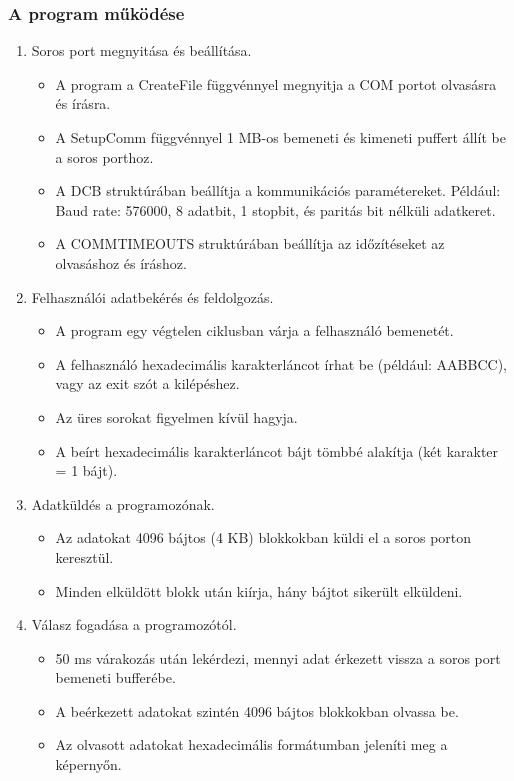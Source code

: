 \documentclass[a4paper,12pt,oneside]{book}
\begin{document}
\subsubsection{A program működése}
\begin{enumerate}
	\item Soros port megnyitása és beállítása.
\begin{itemize}
	\item A program a CreateFile függvénnyel megnyitja a COM portot olvasásra és írásra.
	\item A SetupComm függvénnyel 1 MB-os bemeneti és kimeneti puffert állít be a soros porthoz.
	\item A DCB struktúrában beállítja a kommunikációs paramétereket. Például: Baud rate: 576000, 8 adatbit, 1 stopbit, és paritás bit nélküli adatkeret.
	\item A COMMTIMEOUTS struktúrában beállítja az időzítéseket az olvasáshoz és íráshoz.
\end{itemize}
	\item Felhasználói adatbekérés és feldolgozás.
\begin{itemize}
	\item A program egy végtelen ciklusban várja a felhasználó bemenetét.
	\item A felhasználó hexadecimális karakterláncot írhat be (például: AABBCC), vagy az exit szót a kilépéshez.
	\item Az üres sorokat figyelmen kívül hagyja.
	\item A beírt hexadecimális karakterláncot bájt tömbbé alakítja (két karakter = 1 bájt).
\end{itemize}
	\item Adatküldés a programozónak.
\begin{itemize}
	\item Az adatokat 4096 bájtos (4 KB) blokkokban küldi el a soros porton keresztül.
	\item Minden elküldött blokk után kiírja, hány bájtot sikerült elküldeni.
\end{itemize}
	\item Válasz fogadása a programozótól.
\begin{itemize}
	\item 50 ms várakozás után lekérdezi, mennyi adat érkezett vissza a soros port bemeneti bufferébe.
	\item A beérkezett adatokat szintén 4096 bájtos blokkokban olvassa be.
	\item Az olvasott adatokat hexadecimális formátumban jeleníti meg a képernyőn.
\end{itemize}
\end{enumerate}
\end{document}

